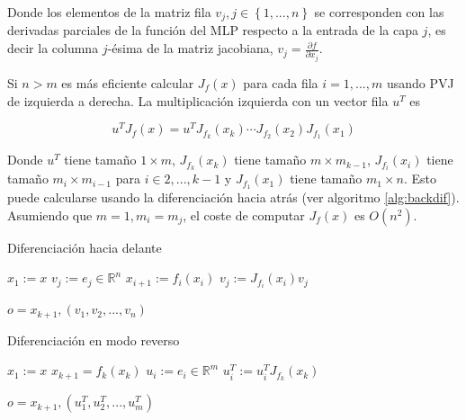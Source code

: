 Donde los elementos de la matriz fila $v_j, j \in \left \{1,...,n \right \}$ se corresponden con las derivadas parciales de la función del MLP respecto a la entrada de la capa $j$, es decir la columna $j$-ésima de la matriz jacobiana, $v_j=\frac{\partial f}{\partial x_j}$. 

Si $n>m$ es más eficiente calcular $J_f(x)$ para cada fila $i=1,...,m$ usando PVJ de izquierda a derecha. La multiplicación izquierda con un vector fila $u^T$ es 

$$u^TJ_f(x)=u^TJ_{f_k}(x_k) \cdots J_{f_2}(x_2) J_{f_1}(x_1)$$

Donde $u^T$ tiene tamaño $1 \times m$,  $J_{f_k}(x_k)$ tiene tamaño $m \times m_{k-1}$, $J_{f_i}(x_i)$ tiene tamaño $m_i \times m_{i-1}$ para $i \in {2,...,k-1}$ y $J_{f_1}(x_1)$ tiene tamaño $m_1 \times n$. Esto puede calcularse usando la diferenciación hacia atrás (ver algoritmo \ref{alg:backdif}). Asumiendo que $m=1, m_i=m_j$, el coste de computar $J_f(x)$ es $O(n^2)$.

 
\begin{algorithm}[H]
\caption{Diferenciación hacia delante}
\label{alg:fowdiff}
    \begin{algorithmic}
        \State $x_1 := x$
            \State $v_j := e_j \in \mathbb{R}^n$
        \EndFor
            \State $x_{i+1}:=f_i(x_i)$
                \State $v_j:= J_{f_i}(x_i)v_j$
            \EndFor
        \EndFor 

        
         \Return $o=x_{k+1}, \left (v_1, v_2, ..., v_n \right )$
        
    \end{algorithmic}
\end{algorithm}


\begin{algorithm}
\caption{Diferenciación en modo reverso}
\label{alg:backdif}
    \begin{algorithmic}
        \State $x_1:=x$
            \State $x_{k+1} = f_k(x_k)$
        \EndFor
            \State $u_i:=e_i \in \mathbb{R}^m$
        \EndFor 
                \State $u_i^T:= u_i^T J_{f_k}(x_k)$
            \EndFor
        \EndFor 

        \Return $o=x_{k+1}, \left ( u_1^T, u_2^T, ..., u_m^T \right )$
    \end{algorithmic}
\end{algorithm}

